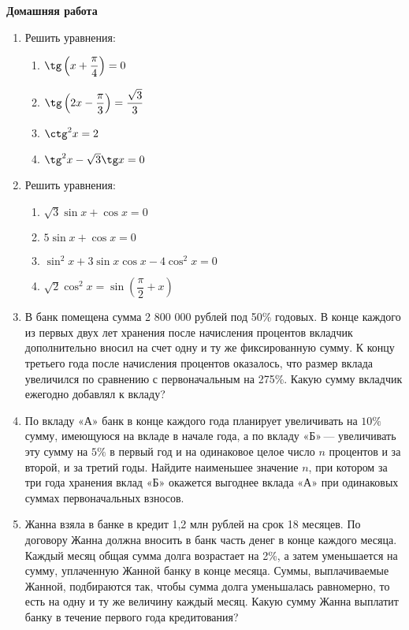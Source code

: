 \documentclass[12pt, a4paper]{article}
\begin{document}
	   \cfoot{}
	\begin{center}
		\Large
		\textbf{Домашняя работа}
	\end{center}
	\begin{enumerate}[label=\textbf{\arabic*.}]
		\item Решить уравнения:
		\begin{multicols}{2}
			\begin{enumerate}[label=\asbuk*)]
				\item \( \tg\left( x+\dfrac{\pi}{4} \right) = 0 \)
				\item \( \tg\left( 2x-\dfrac{\pi}{3} \right)=\dfrac{\sqrt{3}}{3} \)
				\item \( \ctg^2 x = 2 \)
				\item \( \tg^2 x - \sqrt{3}\tg x = 0 \)
			\end{enumerate}
		\end{multicols}
		\item Решить уравнения:
		\begin{multicols}{2}
			\begin{enumerate}[label=\asbuk*)]
				\item \( \sqrt{3}\sin x + \cos x = 0 \)
				\item \( 5\sin x + \cos x = 0 \)
				\item \( \sin^2 x + 3\sin x\cos x - 4\cos^2 x = 0\)
				\item \( \sqrt{2}\cos^2x=\sin\left( \dfrac{\pi}{2}+x \right) \)
			\end{enumerate}
		\end{multicols}
		\item В банк помещена сумма 2 800 000 рублей под 50\% годовых. В конце каждого из первых двух лет хранения после начисления процентов вкладчик дополнительно вносил на счет одну и ту же фиксированную сумму. К концу третьего года после начисления процентов оказалось, что размер вклада увеличился по сравнению с первоначальным на 275\%. Какую сумму вкладчик ежегодно добавлял к вкладу?
		\item По вкладу «А» банк в конце каждого года планирует увеличивать на \( 10\% \) сумму, имеющуюся на вкладе в начале года, а по вкладу «Б» — увеличивать эту сумму на \( 5\% \) в первый год и на одинаковое целое число \( n \) процентов и за второй, и за третий годы. Найдите наименьшее значение \( n \), при котором за три года хранения вклад «Б» окажется выгоднее вклада «А» при одинаковых суммах первоначальных взносов.
		\item Жанна взяла в банке в кредит 1,2 млн рублей на срок 18 месяцев. По договору Жанна должна вносить в банк часть денег в конце каждого месяца. Каждый месяц общая сумма долга возрастает на 2\%, а затем уменьшается на сумму, уплаченную Жанной банку в конце месяца. Суммы, выплачиваемые Жанной, подбираются так, чтобы сумма долга уменьшалась равномерно, то есть на одну и ту же величину каждый месяц. Какую сумму Жанна выплатит банку в течение первого года кредитования?
	\end{enumerate}
\end{document}
